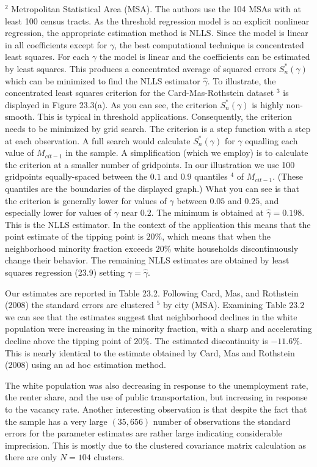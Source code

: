 \documentclass[10pt]{article}
\begin{document}
${ }^{2}$ Metropolitan Statistical Area (MSA). The authors use the 104 MSAs with at least 100 census tracts. As the threshold regression model is an explicit nonlinear regression, the appropriate estimation method is NLLS. Since the model is linear in all coefficients except for $\gamma$, the best computational technique is concentrated least squares. For each $\gamma$ the model is linear and the coefficients can be estimated by least squares. This produces a concentrated average of squared errors $S_{n}^{*}(\gamma)$ which can be minimized to find the NLLS estimator $\widehat{\gamma}$. To illustrate, the concentrated least squares criterion for the Card-Mas-Rothstein dataset ${ }^{3}$ is displayed in Figure 23.3(a). As you can see, the criterion $S_{n}^{*}(\gamma)$ is highly non-smooth. This is typical in threshold applications. Consequently, the criterion needs to be minimized by grid search. The criterion is a step function with a step at each observation. A full search would calculate $S_{n}^{*}(\gamma)$ for $\gamma$ equalling each value of $M_{c i t-1}$ in the sample. A simplification (which we employ) is to calculate the criterion at a smaller number of gridpoints. In our illustration we use 100 gridpoints equally-spaced between the $0.1$ and $0.9$ quantiles ${ }^{4}$ of $M_{c i t-1}$. (These quantiles are the boundaries of the displayed graph.) What you can see is that the criterion is generally lower for values of $\gamma$ between $0.05$ and $0.25$, and especially lower for values of $\gamma$ near $0.2$. The minimum is obtained at $\widehat{\gamma}=0.198$. This is the NLLS estimator. In the context of the application this means that the point estimate of the tipping point is $20 \%$, which means that when the neighborhood minority fraction exceeds $20 \%$ white households discontinuously change their behavior. The remaining NLLS estimates are obtained by least squares regression (23.9) setting $\gamma=\widehat{\gamma}$.

Our estimates are reported in Table 23.2. Following Card, Mas, and Rothstein (2008) the standard errors are clustered ${ }^{5}$ by city (MSA). Examining Table $23.2$ we can see that the estimates suggest that neighborhood declines in the white population were increasing in the minority fraction, with a sharp and accelerating decline above the tipping point of $20 \%$. The estimated discontinuity is $-11.6 \%$. This is nearly identical to the estimate obtained by Card, Mas and Rothstein (2008) using an ad hoc estimation method.

The white population was also decreasing in response to the unemployment rate, the renter share, and the use of public transportation, but increasing in response to the vacancy rate. Another interesting observation is that despite the fact that the sample has a very large $(35,656)$ number of observations the standard errors for the parameter estimates are rather large indicating considerable imprecision. This is mostly due to the clustered covariance matrix calculation as there are only $N=104$ clusters.
\end{document}
